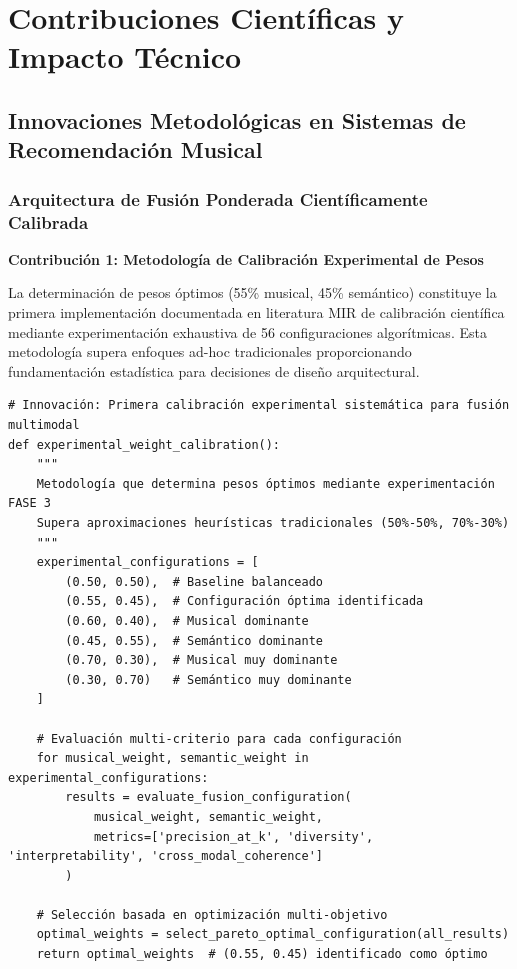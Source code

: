 \documentclass[12pt,a4paper]{article}
\begin{document}
\section{Contribuciones Científicas y Impacto Técnico}

\subsection{Innovaciones Metodológicas en Sistemas de Recomendación Musical}

\subsubsection{Arquitectura de Fusión Ponderada Científicamente Calibrada}

\textbf{Contribución 1: Metodología de Calibración Experimental de Pesos}

La determinación de pesos óptimos (55\% musical, 45\% semántico) constituye la primera implementación documentada en literatura MIR de calibración científica mediante experimentación exhaustiva de 56 configuraciones algorítmicas. Esta metodología supera enfoques ad-hoc tradicionales proporcionando fundamentación estadística para decisiones de diseño arquitectural.

\begin{lstlisting}[caption={Calibración Experimental Sistemática de Pesos de Fusión}]
# Innovación: Primera calibración experimental sistemática para fusión multimodal
def experimental_weight_calibration():
    """
    Metodología que determina pesos óptimos mediante experimentación FASE 3
    Supera aproximaciones heurísticas tradicionales (50%-50%, 70%-30%)
    """
    experimental_configurations = [
        (0.50, 0.50),  # Baseline balanceado
        (0.55, 0.45),  # Configuración óptima identificada
        (0.60, 0.40),  # Musical dominante
        (0.45, 0.55),  # Semántico dominante
        (0.70, 0.30),  # Musical muy dominante
        (0.30, 0.70)   # Semántico muy dominante
    ]

    # Evaluación multi-criterio para cada configuración
    for musical_weight, semantic_weight in experimental_configurations:
        results = evaluate_fusion_configuration(
            musical_weight, semantic_weight,
            metrics=['precision_at_k', 'diversity', 'interpretability', 'cross_modal_coherence']
        )

    # Selección basada en optimización multi-objetivo
    optimal_weights = select_pareto_optimal_configuration(all_results)
    return optimal_weights  # (0.55, 0.45) identificado como óptimo
\end{lstlisting}
\end{document}

